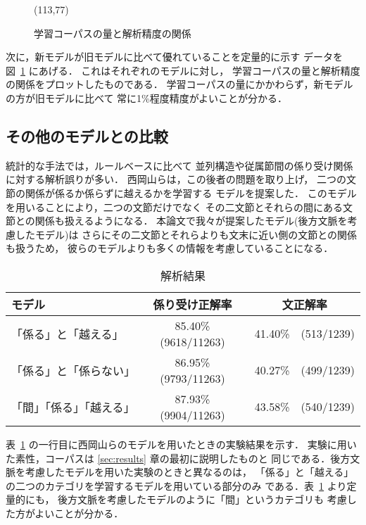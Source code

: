 \begin{figure}[htbp]
  \begin{center}
    \leavevmode
\atari(113,77)
    \caption{学習コーパスの量と解析精度の関係}
    \label{fig:learning_curve}
  \end{center}
\end{figure}
次に，新モデルが旧モデルに比べて優れていることを定量的に示す
データを図~\ref{fig:learning_curve} にあげる．
これはそれぞれのモデルに対し，
学習コーパスの量と解析精度の関係をプロットしたものである．
学習コーパスの量にかかわらず，新モデルの方が旧モデルに比べて
常に1\%程度精度がよいことが分かる．

\subsection{その他のモデルとの比較}
\label{sec:comparison_with_related_works}

統計的な手法では，ルールベースに比べて
並列構造や従属節間の係り受け関係に対する解析誤りが多い．
西岡山らは，この後者の問題を取り上げ，
二つの文節の関係が係るか係らずに越えるかを学習する
モデルを提案した\cite{Nishiokayama:98}．
このモデルを用いることにより，二つの文節だけでなく
その二文節とそれらの間にある文節との関係も扱えるようになる．
本論文で我々が提案したモデル(後方文脈を考慮したモデル)は
さらにその二文節とそれらよりも文末に近い側の文節との関係も扱うため，
彼らのモデルよりも多くの情報を考慮していることになる．

\begin{table}[htbp]
  \begin{center}
    \caption{解析結果}
    \label{Result2} 
    \begin{tabular}{|l@{ }|c@{ }|r@{}c@{ }|}
      \hline
      モデル & 係り受け正解率 & \multicolumn{2}{c|}{文正解率}\\
      \hline      
      「係る」と「越える」 & 85.40\% (9618/11263) & 41.40\% & (513/1239) \\
      「係る」と「係らない」 & 86.95\% (9793/11263) & 40.27\% & (499/1239) \\
      「間」「係る」「越える」 
      & 87.93\% (9904/11263) & 43.58\% & (540/1239) \\
      \hline
    \end{tabular}
  \end{center}
\end{table}

表~\ref{Result2} の一行目に西岡山らのモデルを用いたときの実験結果を示す．
実験に用いた素性，コーパスは \ref{sec:results} 章の最初に説明したものと
同じである．後方文脈を考慮したモデルを用いた実験のときと異なるのは，
「係る」と「越える」の二つのカテゴリを学習するモデルを用いている部分のみ
である．表~\ref{Result2} より定量的にも，
後方文脈を考慮したモデルのように「間」というカテゴリも
考慮した方がよいことが分かる．

